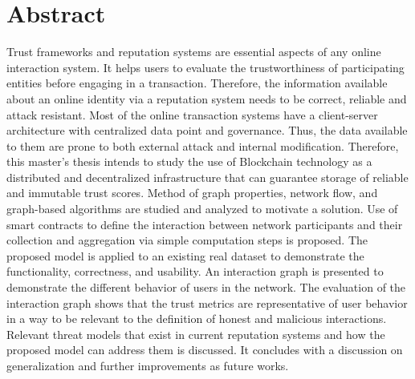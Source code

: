 \chapter*{Abstract}
Trust frameworks and reputation systems are essential aspects of any online
interaction system. It helps users to evaluate the trustworthiness of
participating entities before engaging in a transaction. Therefore, the
information available about an online identity via a reputation system needs to
be correct, reliable and attack resistant. Most of the online transaction
systems have a client-server architecture with centralized data point and
governance. Thus, the data available to them are prone to both external attack
and internal modification. Therefore, this master's thesis intends to study the
use of Blockchain technology as a distributed and decentralized infrastructure
that can guarantee storage of reliable and immutable trust scores. Method of
graph properties, network flow, and graph-based algorithms are studied and
analyzed to motivate a solution. Use of smart contracts to define the
interaction between network participants and their collection and aggregation
via simple computation steps is proposed. The proposed model is applied to an
existing real dataset to demonstrate the functionality, correctness, and
usability. An interaction graph is presented to demonstrate the different
behavior of users in the network. The evaluation of the interaction graph shows
that the trust metrics are representative of user behavior in a way to be
relevant to the definition of honest and malicious interactions. Relevant
threat models that exist in current reputation systems and how the proposed
model can address them is discussed. It concludes with a discussion on
generalization and further improvements as future works. 

